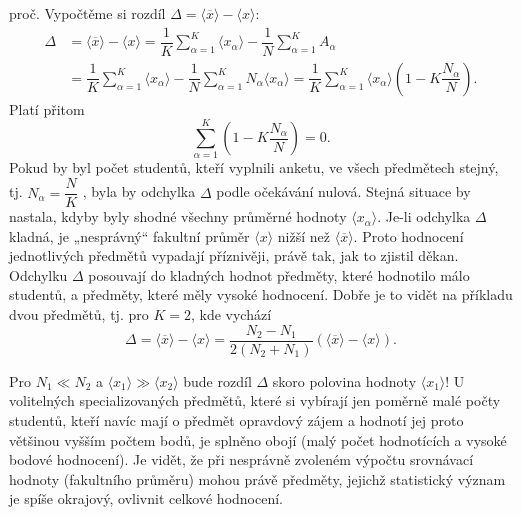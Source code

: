 \begin{example}
  proč. Vypočtěme si rozdíl \(\Delta = \langle \overline{x} \rangle - \langle x \rangle\):
  \begin{align*}
    \Delta &= \langle \overline{x} \rangle - \langle x \rangle 
            = \dfrac{1}{K}\sum_{\alpha=1}^{K}\langle x_\alpha \rangle
            - \dfrac{1}{N}\sum_{\alpha=1}^{K}A_\alpha                           \\
           &= \dfrac{1}{K}\sum_{\alpha=1}^{K}\langle x_\alpha \rangle
            - \dfrac{1}{N}\sum_{\alpha=1}^{K}N_\alpha\langle x_\alpha \rangle
            = \dfrac{1}{K}\sum_{\alpha=1}^{K}\langle x_\alpha\rangle\left(1 - 
             K\dfrac{N_\alpha}{N}\right).
  \end{align*}
  Platí přitom
  \begin{equation*}
    \sum_{\alpha=1}^{K}\left(1 - K\dfrac{N_\alpha}{N}\right) = 0.
  \end{equation*}
  Pokud by byl počet studentů, kteří vyplnili anketu, ve všech předmětech stejný, tj. \(N_\alpha = 
  \dfrac{N}{K}\) , byla by odchylka \(\Delta\) podle očekávání nulová. Stejná situace by nastala, 
  kdyby byly shodné všechny průměrné hodnoty \(\langle x_\alpha \rangle\). Je-li odchylka 
  \(\Delta\) kladná, je „nesprávný“ fakultní průměr \(\langle x \rangle\) nižší než \(\langle 
  \overline{x} \rangle\). Proto hodnocení jednotlivých předmětů vypadají příznivěji, právě tak, jak 
  to zjistil děkan. Odchylku \(\Delta\) posouvají do kladných hodnot předměty, které hodnotilo málo 
  studentů, a předměty, které měly vysoké hodnocení. Dobře je to vidět na příkladu dvou předmětů, 
  tj. pro \(K = 2\), kde vychází
  \begin{equation*}
    \Delta = \langle \overline{x} \rangle - \langle x \rangle 
           = \dfrac{N_2 - N_1}{2(N_2+N_1)}\left(\langle\overline{x}\rangle-\langle x\rangle\right).
  \end{equation*}
  
  Pro \(N_1\ll N_2\) a \(\langle x_1 \rangle  \gg \langle x_2 \rangle \) bude rozdíl \(\Delta\) 
  skoro polovina hodnoty \(\langle x_1 \rangle\)! U volitelných specializovaných předmětů, které si 
  vybírají jen poměrně malé počty studentů, kteří navíc mají o předmět opravdový zájem a hodnotí 
  jej proto většinou vyšším počtem bodů, je splněno obojí (malý počet hodnotících a vysoké bodové
  hodnocení). Je vidět, že při nesprávně zvoleném výpočtu srovnávací hodnoty (fakultního průměru) 
  mohou právě předměty, jejichž statistický význam je spíše okrajový, ovlivnit celkové hodnocení.
\normalsize
\end{example}